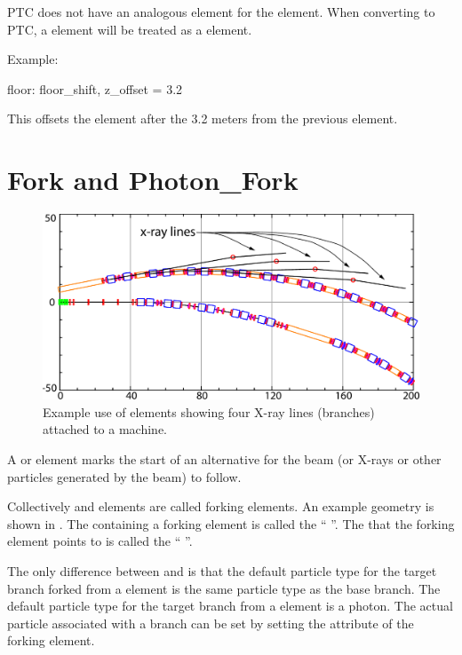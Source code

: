PTC does not have an analogous element for the 
element. When converting to PTC, a  element will be treated
as a  element.

Example: 
\begin{example}
  floor: floor_shift, z_offset = 3.2
\end{example}
This offsets the element after the  3.2 meters from the previous
element.

\section{Fork and Photon_Fork}
\label{s:fork}

\begin{figure}[tb]
  \centering
  \includegraphics[width=5in]{x-fork.pdf}
  \caption[Example with photon_fork elements.]
  {
Example use of  elements showing four X-ray lines (branches)
attached to a machine.
  }
  \label{f:x.fork}
\end{figure}

A  or  element marks the start of an
alternative  for the beam (or X-rays or other
particles generated by the beam) to follow. 

Collectively  and  elements are called
forking elements. An example geometry is shown in .  The
 containing a forking element is called the ``
''. The  that the forking element points to is
called the `` ''. 

The only difference between  and  is that the
default particle type for the target branch forked from a 
element is the same particle type as the base branch. The default
particle type for the target branch from a  element is
a photon. The actual particle associated with a branch can be set by
setting the  attribute of the forking element.

